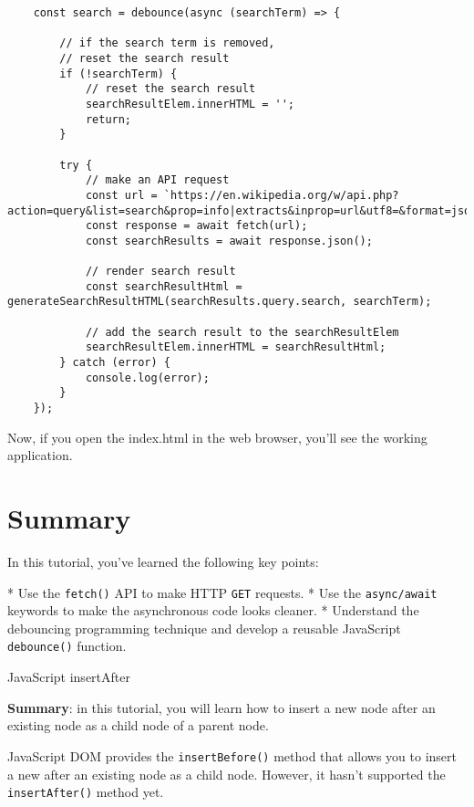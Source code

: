 \documentclass[11pt]{article}
\begin{document}
\begin{lstlisting}
    const search = debounce(async (searchTerm) => {

        // if the search term is removed, 
        // reset the search result
        if (!searchTerm) {
            // reset the search result
            searchResultElem.innerHTML = '';
            return;
        }

        try {
            // make an API request
            const url = `https://en.wikipedia.org/w/api.php?action=query&list=search&prop=info|extracts&inprop=url&utf8=&format=json&origin=*&srlimit=10&srsearch=${searchTerm}`;
            const response = await fetch(url);
            const searchResults = await response.json();

            // render search result
            const searchResultHtml = generateSearchResultHTML(searchResults.query.search, searchTerm);

            // add the search result to the searchResultElem
            searchResultElem.innerHTML = searchResultHtml;
        } catch (error) {
            console.log(error);
        }
    });
\end{lstlisting}

\noindent
Now, if you open the index.html in the web browser, you'll see the
working application.

\section*{Summary}

In this tutorial, you've learned the following key points:

* Use the \verb|fetch()| API to make HTTP \verb|GET| requests.
* Use the \verb|async/await| keywords to make the asynchronous code
looks cleaner.
* Understand the debouncing programming technique and develop a
reusable JavaScript \verb|debounce()| function.

{\huge JavaScript insertAfter}

\begin{displayquote}
\textbf{Summary}: in this tutorial, you will learn how to insert a
new node after an existing node as a child node of a parent node.
\end{displayquote}

\noindent
JavaScript DOM provides the \verb|insertBefore()| method that allows
you to insert a new after an existing node as a child node.
However, it hasn't supported the \verb|insertAfter()| method yet.
\newline
\end{document}
